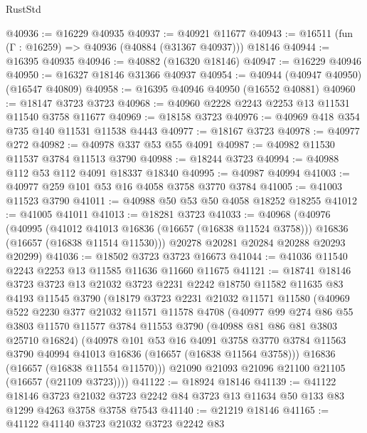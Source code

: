 \begin{lexlean}{RustStd}
\begin{coremodule}
@40936 := @16229 @40935
@40937 := @40921 @11677
@40943 := @16511 (fun (Γ : @16259) => @40936 (@40884 (@31367 @40937))) @18146
@40944 := @16395 @40935
@40946 := @40882 (@16320 @18146)
@40947 := @16229 @40946
@40950 := @16327 @18146 @31366 @40937
@40954 := @40944 (@40947 @40950) (@16547 @40809)
@40958 := @16395 @40946 @40950 (@16552 @40881)
@40960 := @18147 @3723 @3723
@40968 := @40960 @2228 @2243 @2253 @13 @11531 @11540 @3758 @11677
@40969 := @18158 @3723
@40976 := @40969 @418 @354 @735 @140 @11531 @11538 @4443
@40977 := @18167 @3723
@40978 := @40977 @272
@40982 := @40978 @337 @53 @55 @4091
@40987 := @40982 @11530 @11537 @3784 @11513 @3790
@40988 := @18244 @3723
@40994 := @40988 @112 @53 @112 @4091 @18337 @18340
@40995 := @40987 @40994
@41003 := @40977 @259 @101 @53 @16 @4058 @3758 @3770 @3784
@41005 := @41003 @11523 @3790
@41011 := @40988 @50 @53 @50 @4058 @18252 @18255
@41012 := @41005 @41011
@41013 := @18281 @3723
@41033 := @40968
    (@40976
      (@40995
        (@41012 @41013 @16836 (@16657 (@16838 @11524 @3758)))
        @16836
        (@16657 (@16838 @11514 @11530)))
      @20278
      @20281
      @20284
      @20288
      @20293
      @20299)
@41036 := @18502 @3723 @3723 @16673
@41044 := @41036 @11540 @2243 @2253 @13 @11585 @11636 @11660 @11675
@41121 := @18741
    @18146
    @3723
    @3723
    @13
    @21032
    @3723
    @2231
    @2242
    @18750
    @11582
    @11635
    @83
    @4193
    @11545
    @3790
    (@18179
      @3723
      @2231
      @21032
      @11571
      @11580
      (@40969
        @522
        @2230
        @377
        @21032
        @11571
        @11578
        @4708
        (@40977
          @99
          @274
          @86
          @55
          @3803
          @11570
          @11577
          @3784
          @11553
          @3790
          (@40988 @81 @86 @81 @3803 @25710 @16824)
          (@40978
            @101
            @53
            @16
            @4091
            @3758
            @3770
            @3784
            @11563
            @3790
            @40994
            @41013
            @16836
            (@16657 (@16838 @11564 @3758)))
          @16836
          (@16657 (@16838 @11554 @11570)))
        @21090
        @21093
        @21096
        @21100
        @21105
        (@16657 (@21109 @3723))))
@41122 := @18924 @18146
@41139 := @41122
    @18146
    @3723
    @21032
    @3723
    @2242
    @84
    @3723
    @13
    @11634
    @50
    @133
    @83
    @1299
    @4263
    @3758
    @3758
    @7543
@41140 := @21219 @18146
@41165 := @41122
    @41140
    @3723
    @21032
    @3723
    @2242
    @83

\end{coremodule}
\end{lexlean}
